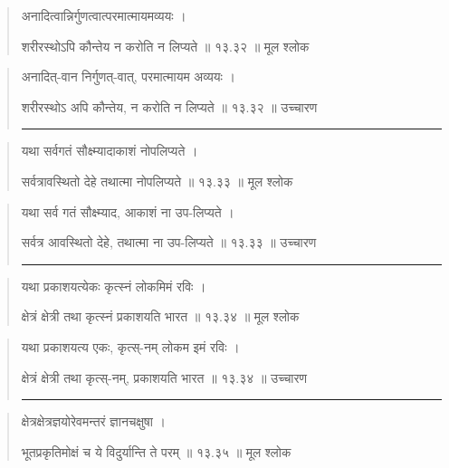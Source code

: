 \begin{quotation}

अनादित्वान्निर्गुणत्वात्परमात्मायमव्ययः  ।  

शरीरस्थोऽपि कौन्तेय न करोति न लिप्यते  ॥ १३.३२ ॥  मूल श्लोक
\end{quotation}

\begin{quotation}

अनादित्-वान निर्गुणत्-वात्,  परमात्मायम अव्ययः  ।  

शरीरस्थोऽ अपि कौन्तेय, न करोति न लिप्यते  ॥ १३.३२ ॥  उच्चारण

\noindent\rule{16cm}{0.4pt} 
\end{quotation}


\begin{quotation}

यथा सर्वगतं सौक्ष्म्यादाकाशं नोपलिप्यते  ।  

सर्वत्रावस्थितो देहे तथात्मा नोपलिप्यते  ॥ १३.३३ ॥  मूल श्लोक
\end{quotation}

\begin{quotation}

यथा सर्व गतं सौक्ष्म्याद, आकाशं ना उप-लिप्यते  ।  

सर्वत्र आवस्थितो देहे, तथात्मा ना उप-लिप्यते  ॥ १३.३३ ॥  उच्चारण

\noindent\rule{16cm}{0.4pt} 
\end{quotation}


\begin{quotation}

यथा प्रकाशयत्येकः कृत्स्नं लोकमिमं रविः  ।  

क्षेत्रं क्षेत्री तथा कृत्स्नं प्रकाशयति भारत  ॥ १३.३४ ॥  मूल श्लोक
\end{quotation}

\begin{quotation}
यथा प्रकाशयत्य एकः, कृत्स्-नम् लोकम इमं रविः ।  

क्षेत्रं क्षेत्री तथा कृत्स्-नम्, प्रकाशयति भारत  ॥ १३.३४ ॥  उच्चारण

\noindent\rule{16cm}{0.4pt} 
\end{quotation}


\begin{quotation}

क्षेत्रक्षेत्रज्ञयोरेवमन्तरं ज्ञानचक्षुषा  ।  

भूतप्रकृतिमोक्षं च ये विदुर्यान्ति ते परम्‌  ॥ १३.३५ ॥  मूल श्लोक
\end{quotation}

